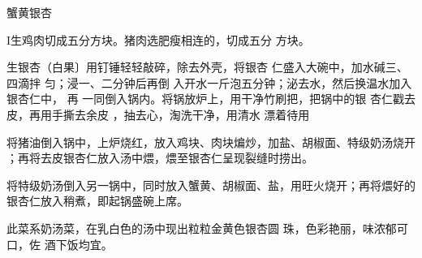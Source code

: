 \begin{recipe}{蟹黄银杏}

\ingredients



\preparation

I生鸡肉切成五分方块。猪肉选肥瘦相连的，切成五分 方块。

生银杏（白果〕用钉锤轻轻敲碎，除去外壳，将银杏 仁盛入大碗中，加水碱三、四滴拌
匀；浸一、二分钟后再倒 入开水一斤泡五分钟；泌去水，然后换温水加入银杏仁中， 再
一同倒入锅内。将锅放炉上，用干净竹刷把，把锅中的银 杏仁戳去皮，再用手撕去余皮
，抽去心，淘洗干净，用清水 漂着待用

\step 将猪油倒入锅中，上炉烧红，放入鸡块、肉块煸炒，加盐、胡椒面、特级奶汤烧开
；再将去皮银杏仁放入汤中煨，煨至银杏仁呈现裂缝时捞出。

\step 将特级奶汤倒入另一锅中，同时放入蟹黄、胡椒面、盐，用旺火烧开；再将煨好的
银杏仁放入稍煮，即起锅盛碗上席。

\features

此菜系奶汤菜，在乳白色的汤中现出粒粒金黄色银杏圆 珠，色彩艳丽，味浓郁可口，佐
酒下饭均宜。

\end{recipe}

